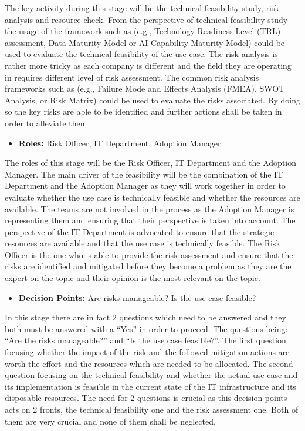 \documentclass[]{imc-inf}
\def\tightlist{}
\begin{document}
The key activity during this stage will be the technical feasibility
study, risk analysis and resource check. From the perspective of
technical feasibility study the usage of the framework such as (e.g.,
Technology Readiness Level (TRL) assessment, Data Maturity Model or AI
Capability Maturity Model) could be used to evaluate the technical
feasibility of the use case. The risk analysis is rather more tricky as
each company is different and the field they are operating in requires
different level of risk assessment. The common risk analysis frameworks
such as (e.g., Failure Mode and Effects Analysis (FMEA), SWOT Analysis,
or Risk Matrix) could be used to evaluate the risks associated. By doing
so the key risks are able to be identified and further actions shall be
taken in order to alleviate them

\begin{itemize}
	\tightlist
	\item
	\textbf{Roles:} Risk Officer, IT Department, Adoption Manager
\end{itemize}

The roles of this stage will be the Risk Officer, IT Department and the
Adoption Manager. The main driver of the feasibility will be the
combination of the IT Department and the Adoption Manager as they will
work together in order to evaluate whether the use case is technically
feasible and whether the resources are available. The teams are not
involved in the process as the Adoption Manager is representing them and
ensuring that their perspective is taken into account. The perspective
of the IT Department is advocated to ensure that the strategic resources
are available and that the use case is technically feasible. The Risk
Officer is the one who is able to provide the risk assessment and ensure
that the risks are identified and mitigated before they become a problem
as they are the expert on the topic and their opinion is the most
relevant on the topic.

\begin{itemize}
	\tightlist
	\item
	\textbf{Decision Points:} Are risks manageable? Is the use case
	feasible?
\end{itemize}

In this stage there are in fact 2 questions which need to be answered
and they both must be answered with a ``Yes'' in order to proceed. The
questions being: ``Are the risks manageable?'' and ``Is the use case
feasible?''. The first question focusing whether the impact of the risk
and the followed mitigation actions are worth the effort and the
resources which are needed to be allocated. The second question focusing
on the technical feasibility and whether the actual use case and its
implementation is feasible in the current state of the IT infrastructure
and its disposable resources. The need for 2 questions is crucial as
this decision points acts on 2 fronts, the technical feasibility one and
the risk assessment one. Both of them are very crucial and none of them
shall be neglected.
\end{document}
